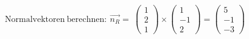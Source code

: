 \documentclass[preview]{standalone}
\begin{document}
\begin{center}
$\mathrm{Normalvektoren \: berechnen:} \: \vec{n_R} = \:\begin{pmatrix} 1 \\ 2 \\ 1 \end{pmatrix} \times \begin{pmatrix} 1 \\ -1 \\ 2 \end{pmatrix} = \begin{pmatrix} 5 \\ -1 \\ -3 \end{pmatrix}$
\end{center}
\end{document}
